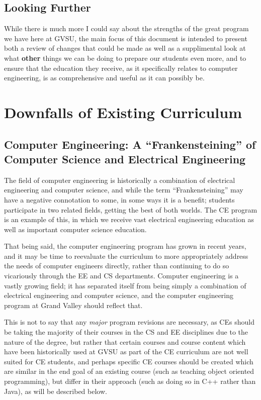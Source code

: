 \documentclass[12pt]{article}
\numberwithin{figure}{section}
\numberwithin{equation}{section}
\begin{document}
{\subsection{Looking Further}\label{looking-further}
While there is much more I could say about the strengths of the great
program we have here at GVSU, the main focus of this document is
intended to present both a review of changes that could be made as well
as a supplimental look at what \textbf{other} things we can be doing to
prepare our students even more, and to ensure that the education they
receive, as it specifically relates to computer engineering, is as
comprehensive and useful as it can possibly be.

\newpage
\section{Downfalls of Existing Curriculum}\label{downfalls}

\subsection{Computer Engineering: A ``Frankensteining'' of Computer Science and Electrical Engineering}\label{frankenstein}
The field of computer engineering is historically a combination of
electrical engineering and computer science, and while the term
``Frankensteining'' may have a negative connotation to some, in some
ways it is a benefit; students participate in two related fields,
getting the best of both worlds. The CE program is an example of this,
in which we receive vast electrical engineering education as well as
important computer science education.

\bigskip

That being said, the computer engineering program has grown in recent
years, and it may be time to reevaluate the curriculum to more
appropriately address the needs of computer engineers directly, rather
than continuing to do so vicariously through the EE and CS departments.
Computer engineering is a vastly growing field; it has separated itself
from being simply a combination of electrical engineering and computer
science, and the computer engineering program at Grand Valley should
reflect that.

\bigskip

This is not to say that any \emph{major} program revisions are
necessary, as CEs should be taking the majority of their courses
in the CS and EE disciplines due to the nature of the degree, but rather that certain courses and course content which have been historically used at GVSU as part of the CE curriculum are not well suited for CE students, and perhaps specific CE courses should be created which are similar in the end goal of an existing course (such as teaching object oriented programming), but differ in their approach (such as doing so in C++ rather than Java), as will be described below.

}
\end{document}
